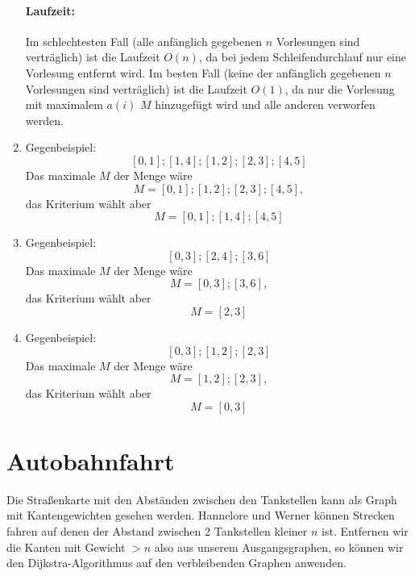 \documentclass[a4paper,10pt]{article}
\begin{document}
\begin{enumerate}
        \paragraph*{Laufzeit:} Im schlechtesten Fall (alle anfänglich gegebenen $n$ Vorlesungen sind verträglich) ist die Laufzeit $O(n)$, da bei jedem Schleifendurchlauf nur eine Vorlesung entfernt wird.
        Im besten Fall (keine der anfänglich gegebenen $n$ Vorlesungen sind verträglich) ist die Laufzeit $O(1)$, da nur die Vorlesung mit maximalem $a(i)$ $M$ hinzugefügt wird und alle anderen verworfen werden.
\item   Gegenbeispiel:
        \[[0,1];[1,4];[1,2];[2,3];[4,5]\]
        Das maximale $M$ der Menge wäre 
        \[M = [0,1];[1,2];[2,3];[4,5],\] 
        das Kriterium wählt aber 
        \[M = [0,1];[1,4];[4,5]\]
\item   Gegenbeispiel:
        \[[0,3];[2,4];[3,6]\]
        Das maximale $M$ der Menge wäre 
        \[M = [0,3];[3,6],\] 
        das Kriterium wählt aber 
        \[M = [2,3]\]
\item   Gegenbeispiel:
        \[[0,3];[1,2];[2,3]\]
        Das maximale $M$ der Menge wäre 
        \[M = [1,2];[2,3],\] 
        das Kriterium wählt aber 
        \[M = [0,3]\]
\end{enumerate}

\section{Autobahnfahrt}
Die Straßenkarte mit den Abständen zwischen den Tankstellen kann als Graph mit Kantengewichten gesehen werden.
Hannelore und Werner können Strecken fahren auf denen der Abstand zwischen 2 Tankstellen kleiner $n$ ist. 
Entfernen wir die Kanten mit Gewicht $> n$ also aus unserem Ausgangsgraphen, so können wir den Dijkstra-Algorithmus auf den verbleibenden Graphen anwenden.
\end{document}
